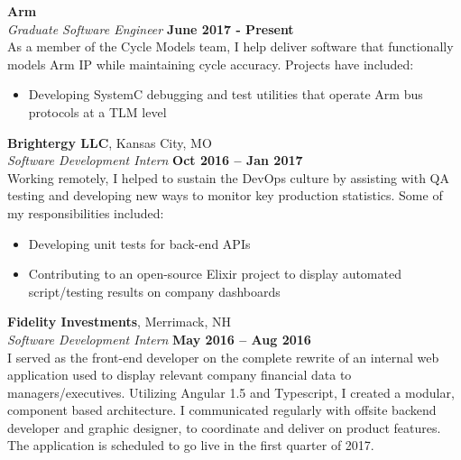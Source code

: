 \documentclass[margin,line]{resume}
\begin{document}
\begin{resume}
    \textbf{Arm}
    \vspace{2mm}\\\vspace{1mm}%
    \textsl{Graduate Software Engineer} \hfill \textbf{June 2017 - Present}\\
    As a member of the Cycle Models team, I help deliver software that functionally models Arm IP while maintaining cycle accuracy. Projects have included:
    \begin{itemize}
        \item Developing SystemC debugging and test utilities that operate Arm bus protocols at a TLM level
    \end{itemize}
    \textbf{Brightergy LLC}, Kansas City, MO \vspace{2mm}\\\vspace{1mm}%
    \textsl{Software Development Intern} \hfill \textbf{Oct 2016 -- Jan 2017}\\
    Working remotely, I helped to sustain the DevOps culture by assisting with QA testing and developing new ways to monitor key production statistics.  Some of my responsibilities included:
    \begin{itemize}
        \item Developing unit tests for back-end APIs
        \item Contributing to an open-source Elixir project to display automated script/testing results on company dashboards
    \end{itemize}

    \textbf{Fidelity Investments}, Merrimack, NH \vspace{2mm}\\\vspace{1mm}%
    \textsl{Software Development Intern} \hfill \textbf{May 2016 -- Aug 2016}\\
   I served as the front-end developer on the complete rewrite of an internal web application used to display relevant company financial data to managers/executives. Utilizing Angular 1.5 and Typescript, I created a modular, component based architecture. I communicated regularly with offsite backend developer and graphic designer, to coordinate and deliver on product features. The application is scheduled to go live in the first quarter of 2017.


\end{resume}
\end{document}
